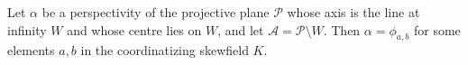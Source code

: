 Let $\alpha$ be a perspectivity of the projective plane $\mathcal{P}$ whose axis is the line at infinity $W$ and whose centre lies on $W$, and let $\mathcal{A} = \mathcal{P} \setminus W$. Then $\alpha = \phi_{a,b}$ for some elements $a, b$ in the coordinatizing skewfield $K$.
